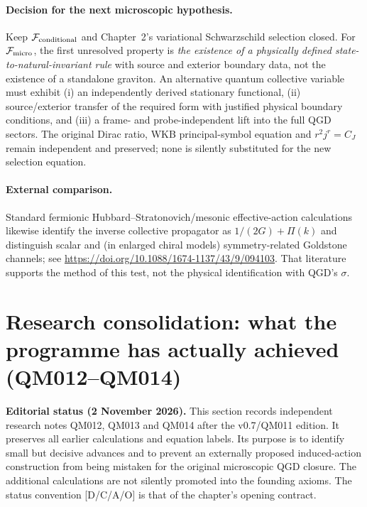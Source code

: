 \documentclass[11pt,a4paper]{article}
\begin{document}
\paragraph{Decision for the next microscopic hypothesis.} Keep $\mathcal F_{\rm conditional}$ and Chapter~2's variational Schwarzschild selection closed. For $\mathcal F_{\rm micro}$, the first unresolved property is \emph{the existence of a physically defined state-to-natural-invariant rule} with source and exterior boundary data, not the existence of a standalone graviton. An alternative quantum collective variable must exhibit (i) an independently derived stationary functional, (ii) source/exterior transfer of the required form with justified physical boundary conditions, and (iii) a frame- and probe-independent lift into the full QGD sectors. The original Dirac ratio, WKB principal-symbol equation and $r^2j^r=C_J$ remain independent and preserved; none is silently substituted for the new selection equation.

\paragraph{External comparison.} Standard fermionic Hubbard--Stratonovich/mesonic effective-action calculations likewise identify the inverse collective propagator as $1/(2G)+\Pi(k)$ and distinguish scalar and (in enlarged chiral models) symmetry-related Goldstone channels; see \url{https://doi.org/10.1088/1674-1137/43/9/094103}. That literature supports the method of this test, not the physical identification with QGD's $\sigma$.

\section{Research consolidation: what the programme has actually achieved (QM012--QM014)}\label{sec:v08-small-wins}
\textbf{Editorial status (2 November 2026).} This section records independent research notes QM012, QM013 and QM014 after the v0.7/QM011 edition. It preserves all earlier calculations and equation labels. Its purpose is to identify small but decisive advances and to prevent an externally proposed induced-action construction from being mistaken for the original microscopic QGD closure. The additional calculations are not silently promoted into the founding axioms. The status convention [D/C/A/O] is that of the chapter's opening contract.
\end{document}
